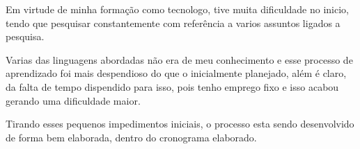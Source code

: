 Em virtude de minha formação como tecnologo, tive muita dificuldade no inicio, tendo que pesquisar constantemente com referência a varios assuntos ligados a pesquisa.

Varias das linguagens abordadas não era de meu conhecimento e esse processo de aprendizado foi mais despendioso do que o inicialmente planejado, além é claro, da falta de tempo dispendido para isso, pois tenho emprego fixo e isso acabou gerando uma dificuldade maior.

Tirando esses pequenos impedimentos iniciais, o processo esta sendo desenvolvido de forma bem elaborada, dentro do cronograma elaborado.
